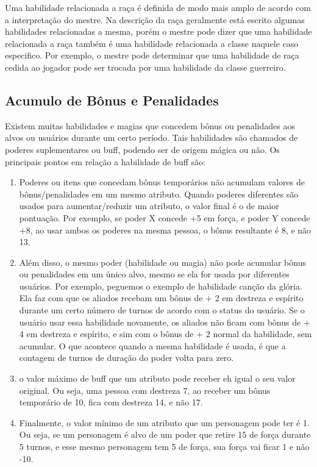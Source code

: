 Uma habilidade relacionada a raça é definida de modo mais amplo de acordo com a interpretação do mestre. Na descrição da raça geralmente está escrito algumas habilidades relacionadas a mesma, porém o mestre pode dizer que uma habilidade relacionada a raça também é uma habilidade relacionada a classe naquele caso especifico. Por exemplo, o mestre pode determinar que uma habilidade de raça cedida ao jogador pode ser trocada por uma habilidade da classe guerreiro.

\subsection{Acumulo de Bônus e Penalidades}

Existem muitas habilidades e magias que concedem bônus ou penalidades aos alvos ou usuários durante um certo período. Tais habilidades são chamados de poderes suplementares ou buff, podendo ser de origem mágica ou não. Os principais pontos em relação a habilidade de buff são: 

\begin{enumerate}

\item Poderes ou itens que concedam bônus temporários não acumulam valores de bônus/penalidades em um mesmo atributo. Quando poderes diferentes são usados para aumentar/reduzir um atributo, o valor final é o de maior pontuação. Por exemplo, se poder X concede +5 em força, e poder Y concede +8, ao usar ambos os poderes na mesma pessoa, o bônus resultante é 8, e não 13.

\item Além disso, o mesmo poder (habilidade ou magia) não pode acumular bônus ou penalidades em um único alvo, mesmo se ela for usada por diferentes usuários. Por exemplo, peguemos o exemplo de habilidade canção da glória. Ela faz com que os aliados recebam um bônus de + 2 em destreza e espírito durante um certo número de turnos de acordo com o status do usuário. Se o usuário usar essa habilidade novamente, os aliados não ficam com bônus de + 4 em destreza e espírito, e sim com o bônus de + 2 normal da habilidade, sem acumular.  O que acontece quando a mesma habilidade é usada, é que a contagem de turnos de duração do poder volta para zero.

\item o valor máximo de buff que um atributo pode receber eh igual o seu valor original. Ou seja, uma pessoa com destreza 7, ao receber um bônus temporário de 10, fica com destreza 14, e não 17.

\item Finalmente, o valor mínimo de um atributo que um personagem pode ter é 1. Ou seja, se um personagem é alvo de um poder que retire 15 de força durante 5 turnos, e esse mesmo personagem tem 5 de força, sua força vai ficar 1 e não -10.
\end{enumerate}


